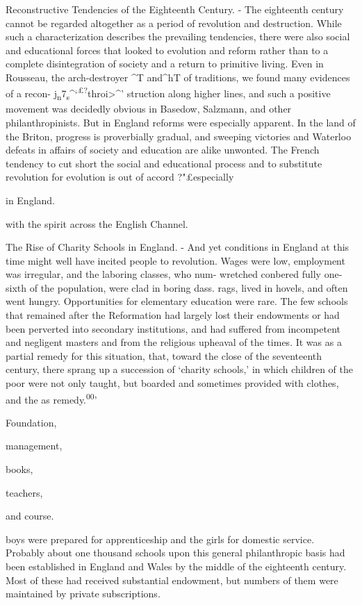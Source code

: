 \documentclass[
]{book}
\begin{document}
Reconstructive Tendencies of the Eighteenth Century. - The eighteenth century cannot be regarded altogether as a period of revolution and destruction. While\protect\hypertarget{ch20.xmlux5cux23para.290.1.0.box.130.254.1263.798.q.60}{}{ such a characterization describes the prevailing tendencies, there were also social and educational forces that looked to evolution and reform rather than to a complete disintegration of society and a return to primitive living. Even in Rousseau, the arch-destroyer \^{}T and\^{}hT of traditions, we found many evidences of a recon- j\textsubscript{n}7\textsubscript{s}\^{}`\textsuperscript{£?}throi\textgreater\^{}' struction along higher lines, and such a positive movement was decidedly obvious in Basedow, Salzmann, and other philanthropinists. But in England reforms were especially apparent. In the land of the Briton, progress is proverbially gradual, and sweeping victories and Waterloo defeats in affairs of society and education are alike unwonted. The French tendency to cut short the social and educational process and to substitute revolution for evolution is out of accord ?"£especially}

in England.

with the spirit across the English Channel.

The Rise of Charity Schools in England. - And yet conditions in England at this time might well have incited people to revolution. Wages were low, employment was irregular, and the laboring classes, who num- wretched conbered fully one-sixth of the population, were clad in boring dass. rags, lived in hovels, and often went hungry. Opportunities for elementary education were rare. The few schools that remained after the Reformation had largely lost their endowments or had been perverted into secondary institutions, and had suffered from incompetent and negligent masters and from the religious upheaval of the times. It was as a partial remedy for this situation, that, toward the close of the seventeenth century, there sprang up a succession of `charity schools,' in which children of the poor were not only taught, but boarded and sometimes provided with clothes, and the as remedy.\textsuperscript{00}'

Foundation,

management,

books,

teachers,

and course.

boys were prepared for apprenticeship and the girls for domestic service. Probably about one thousand schools upon this general philanthropic basis had been established in England and Wales by the middle of the eighteenth century. Most of these had received substantial endowment, but numbers of them were maintained by private subscriptions.
\end{document}

